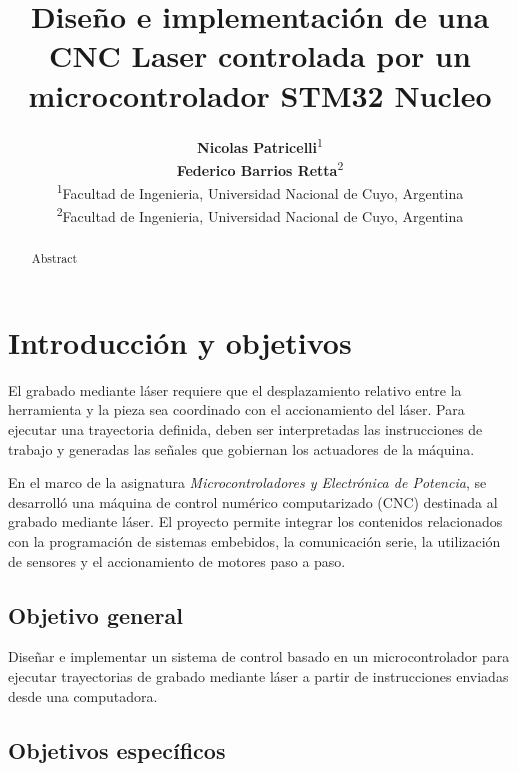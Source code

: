 \documentclass[blue,fullpaper]{ludusofficial}  %
\title{Diseño e implementación de una CNC Laser controlada por un microcontrolador STM32 Nucleo}
\author{%
    \textbf{Nicolas Patricelli}\textsuperscript{1}\\
    [0.2cm]
    \textbf{Federico Barrios Retta}\textsuperscript{2}\\
    [0.2cm]
    \mdseries\small\textsuperscript{1}Facultad de Ingenieria, Universidad Nacional de Cuyo, Argentina\\
    \mdseries\small\textsuperscript{2}Facultad de Ingenieria, Universidad Nacional de Cuyo, Argentina
}
\begin{document}
\begin{abstract}

Abstract

\end{abstract}


\maketitle

\onecolumn
\tableofcontents
\clearpage

\newpage

\section{Introducción y objetivos}

El grabado mediante láser requiere que el desplazamiento
relativo entre la herramienta y la pieza sea coordinado
con el accionamiento del láser. Para ejecutar una trayectoria
definida, deben ser interpretadas las instrucciones de
trabajo y generadas las señales que gobiernan los actuadores
de la máquina.

En el marco de la asignatura \textit{Microcontroladores
y Electrónica de Potencia}, se desarrolló una máquina
de control numérico computarizado (CNC) destinada al
grabado mediante láser. El proyecto permite integrar
los contenidos relacionados con la programación de
sistemas embebidos, la comunicación serie, la utilización
de sensores y el accionamiento de motores paso a paso.

\subsection{Objetivo general}

Diseñar e implementar un sistema de control basado en
un microcontrolador para ejecutar trayectorias de grabado
mediante láser a partir de instrucciones enviadas desde
una computadora.

\subsection{Objetivos específicos}
\end{document}
